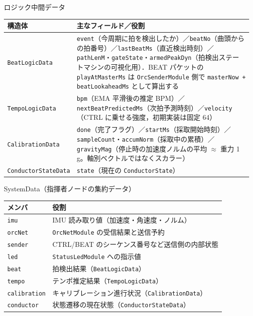 \documentclass[lualatex,book,paper=a4paper,jafontsize=11.5pt,jafontscale=1.05]{jlreq}
\begin{document}
\begin{apibox}{ロジック中間データ}
\begin{tabular}{l p{}}
\toprule
\textbf{構造体} & \textbf{主なフィールド／役割} \\
\midrule
\texttt{BeatLogicData}      & \texttt{event}（今周期に拍を検出したか）／\texttt{beatNo}（曲頭からの拍番号）／\texttt{lastBeatMs}（直近検出時刻）／\texttt{pathLenM}・\texttt{gateState}・\texttt{armedPeakDyn}（拍検出ステートマシンの可視化用）．BEAT パケットの \texttt{playAtMasterMs} は \texttt{OrcSenderModule} 側で \texttt{masterNow + beatLookaheadMs} として算出する \\
\texttt{TempoLogicData}     & \texttt{bpm}（EMA 平滑後の推定 BPM）／\texttt{nextBeatPredictedMs}（次拍予測時刻）／\texttt{velocity}（CTRL に乗せる強度，初期実装は固定 64） \\
\texttt{CalibrationData}    & \texttt{done}（完了フラグ）／\texttt{startMs}（採取開始時刻）／\texttt{sampleCount}・\texttt{accumNorm}（採取中の累積）／\texttt{gravityMag}（停止時の加速度ノルムの平均 $\approx$ 重力 1\,g。軸別ベクトルではなくスカラー） \\
\texttt{ConductorStateData} & \texttt{state}（現在の \texttt{ConductorState}） \\
\bottomrule
\end{tabular}
\end{apibox}

\begin{apibox}{SystemData（指揮者ノードの集約データ）}
\begin{tabular}{l p{}}
\toprule
\textbf{メンバ} & \textbf{役割} \\
\midrule
\texttt{imu}         & IMU 読み取り値（加速度・角速度・ノルム） \\
\texttt{orcNet}      & \texttt{OrcNetModule} の受信結果と送信予約 \\
\texttt{sender}      & CTRL/BEAT のシーケンス番号など送信側の内部状態 \\
\texttt{led}         & \texttt{StatusLedModule} への指示値 \\
\texttt{beat}        & 拍検出結果（\texttt{BeatLogicData}） \\
\texttt{tempo}       & テンポ推定結果（\texttt{TempoLogicData}） \\
\texttt{calibration} & キャリブレーション進行状況（\texttt{CalibrationData}） \\
\texttt{conductor}   & 状態遷移の現在状態（\texttt{ConductorStateData}） \\
\bottomrule
\end{tabular}
\end{apibox}
\end{document}
